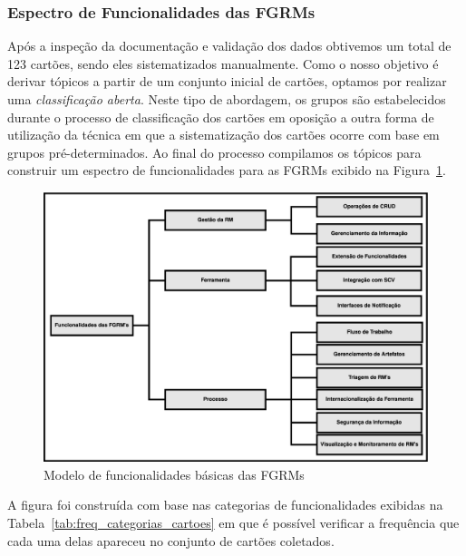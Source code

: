 \subsubsection{Espectro de Funcionalidades das FGRMs}
\label{subsec:categorizacao_ferramentas}

Após a inspeção da documentação e validação dos dados obtivemos um total de 123
cartões, sendo eles sistematizados manualmente. Como o nosso objetivo é derivar
tópicos a partir de um conjunto inicial de cartões, optamos por realizar uma
\textit{classificação aberta}. Neste tipo de abordagem, os grupos são
estabelecidos durante o processo de classificação dos cartões em oposição a
outra forma de utilização da técnica em que a sistematização dos cartões ocorre
com base em grupos pré-determinados. Ao final do processo compilamos os tópicos
para construir um espectro de funcionalidades para as FGRMs exibido na
Figura~\ref{fig:diagrama-espectro-funcionalidades-fgrm}.

\begin{figure}[htpb]
	\centering
    \includegraphics[width=1.15\linewidth]{./chapter-estudo-funcionalidades-fgrm/img/diagrama-espectro-funcionalidades-fgrm.eps}
	\caption{Modelo de funcionalidades básicas das FGRMs}
\label{fig:diagrama-espectro-funcionalidades-fgrm}
\end{figure}

A figura foi construída com base nas categorias de funcionalidades exibidas na
Tabela~\ref{tab:freq_categorias_cartoes} em que é possível verificar a
frequência que cada uma delas apareceu no conjunto de cartões coletados.

